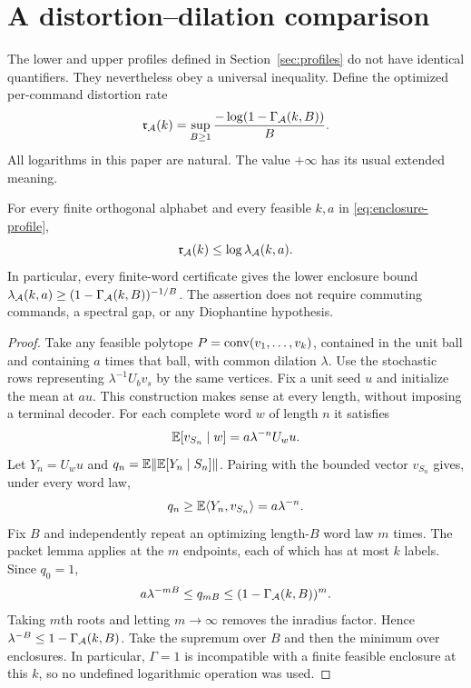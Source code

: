 \section{A distortion--dilation comparison}\label{sec:rate44}
The lower and upper profiles defined in Section~\ref{sec:profiles} do not
have identical quantifiers. They nevertheless obey a universal
inequality. Define the optimized per-command distortion rate
\begin{equation}\label{eq:rate44}
 \mathfrak r_{\mathcal A}(k)=\sup_{B\ge1}
 \frac{-\log(1-\Gamma_{\mathcal A}(k,B))}{B}.
\end{equation}
All logarithms in this paper are natural. The value $+\infty$ has its
usual extended meaning.

\begin{theorem}\label{thm:rate44}
For every finite orthogonal alphabet and every feasible $k,a$ in
\eqref{eq:enclosure-profile},
\begin{equation}\label{eq:rate-inequality44}
 \mathfrak r_{\mathcal A}(k)\le\log\lambda_{\mathcal A}(k,a).
\end{equation}
In particular, every finite-word certificate gives the lower enclosure
bound $\lambda_{\mathcal A}(k,a)\ge
(1-\Gamma_{\mathcal A}(k,B))^{-1/B}$. The assertion does not require
commuting commands, a spectral gap, or any Diophantine hypothesis.
\end{theorem}
\begin{proof}
Take any feasible polytope $P=\operatorname{conv}(v_1,\ldots,v_k)$, contained in the
unit ball and containing $a$ times that ball, with common dilation
$\lambda$. Use the stochastic rows representing
$\lambda^{-1}U_bv_s$ by the same vertices. Fix a unit seed $u$ and
initialize the mean at $au$. This construction makes sense at every
length, without imposing a terminal decoder. For each complete word
$w$ of length $n$ it satisfies
\[
 \mathbb E[v_{S_n}\mid w]=a\lambda^{-n}U_wu.
\]
Let $Y_n=U_wu$ and $q_n=\mathbb E\|\mathbb E[Y_n\mid S_n]\|$. Pairing with the
bounded vector $v_{S_n}$ gives, under every word law,
\begin{equation}\label{eq:rate-lower-amplitude44}
 q_n\ge \mathbb E\langle Y_n,v_{S_n}\rangle=a\lambda^{-n}.
\end{equation}
Fix $B$ and independently repeat an optimizing length-$B$ word law
$m$ times. The packet lemma applies at the $m$ endpoints, each of
which has at most $k$ labels. Since $q_0=1$,
\[
 a\lambda^{-mB}\le q_{mB}\le(1-\Gamma_{\mathcal A}(k,B))^m.
\]
Taking $m$th roots and letting $m\to\infty$ removes the inradius
factor. Hence $\lambda^{-B}\le1-\Gamma_{\mathcal A}(k,B)$. Take the
supremum over $B$ and then the minimum over enclosures. In particular,
$\Gamma=1$ is incompatible with a finite feasible enclosure at this
$k$, so no undefined logarithmic operation was used.
\end{proof}

